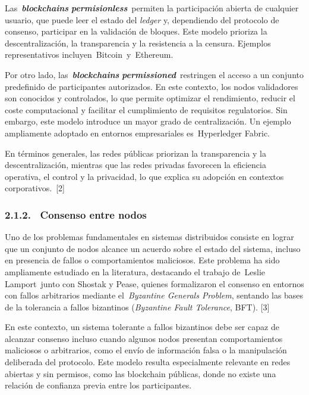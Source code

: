 Las~\textbf{\emph{blockchains}} \emph{\textbf{permisionless}}~permiten
la participación abierta de cualquier usuario, que puede leer el estado
del \emph{ledger} y, dependiendo del protocolo de consenso, participar
en la validación de bloques. Este modelo prioriza la descentralización,
la transparencia y la resistencia a la censura. Ejemplos representativos
incluyen~Bitcoin~y~Ethereum.

Por otro lado, las~\textbf{\emph{blockchains}}
\emph{\textbf{permissioned}}~restringen el acceso a un conjunto
predefinido de participantes autorizados. En este contexto, los nodos
validadores son conocidos y controlados, lo que permite optimizar el
rendimiento, reducir el coste computacional y facilitar el cumplimiento
de requisitos regulatorios. Sin embargo, este modelo introduce un mayor
grado de centralización. Un ejemplo ampliamente adoptado en entornos
empresariales es~Hyperledger Fabric.

En términos generales, las redes públicas priorizan la transparencia y
la descentralización, mientras que las redes privadas favorecen la
eficiencia operativa, el control y la privacidad, lo que explica su
adopción en contextos corporativos.~{[}2{]}

\subsubsection{2.1.2. ~Consenso entre nodos}\label{consenso-entre-nodos}

Uno de los problemas fundamentales en sistemas distribuidos consiste en
lograr que un conjunto de nodos alcance un acuerdo sobre el estado del
sistema, incluso en presencia de fallos o comportamientos maliciosos.
Este problema ha sido ampliamente estudiado en la literatura, destacando
el trabajo de~Leslie Lamport~junto con Shostak y Pease, quienes
formalizaron el consenso en entornos con fallos arbitrarios mediante
el~\emph{Byzantine Generals Problem}, sentando las bases de la
tolerancia a fallos bizantinos (\emph{Byzantine Fault Tolerance}, BFT).
{[}3{]}

En este contexto, un sistema tolerante a fallos bizantinos debe ser
capaz de alcanzar consenso incluso cuando algunos nodos presentan
comportamientos maliciosos o arbitrarios, como el envío de información
falsa o la manipulación deliberada del protocolo. Este modelo resulta
especialmente relevante en redes abiertas y sin permisos, como las
blockchain públicas, donde no existe una relación de confianza previa
entre los participantes.

